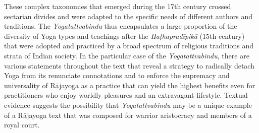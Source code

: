 These complex taxonomies that emerged during the 17th century crossed sectarian divides and were adapted to the specific needs of different authors and traditions. The \textit{Yogatattvabindu} thus encapsulates a large proportion of the diversity of Yoga types and teachings after the \textit{Haṭhapradīpikā} (15th century) that were adopted and practiced by a broad spectrum of religious traditions and strata of Indian society. In the particular case of the \textit{Yogatattvabindu}, there are various statements throughout the text that reveal a strategy to radically detach Yoga from its renunciate connotations and to enforce the supremacy and universality of Rājayoga as a practice that can yield the highest benefits even for practitioners who enjoy worldly pleasures and an extravagant lifestyle. Textual evidence suggests the possibility that \textit{Yogatattvabindu} may be a unique example of a Rājayoga text that was composed for warrior aristocracy and members of a royal court. 

